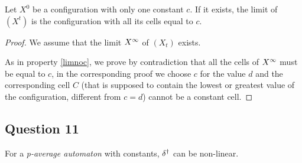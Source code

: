 
\begin{prop}
  \label{twocst}
  Let $X^0$ be a configuration with only one constant $c$. If it exists, the limit of $(X^t)$ is the configuration with all its cells equal to $c$.
\end{prop}

\begin{proof}
  We assume that the limit $X^{\infty}$ of $(X_t)$ exists.
  
  As in property \ref{limnoc}, we prove by contradiction that all the cells of $X^{\infty}$ must be equal to $c$, in the corresponding proof we choose $c$ for the value $d$ and the corresponding cell $C$ (that is supposed to contain the lowest or greatest value of the configuration, different from $c=d$) cannot be a constant cell.
\end{proof}


\subsection*{Question 11}

 \begin{prop}
    For a \textit{p-average automaton} with constants, $\delta^{\dag}$ can be non-linear.
 \end{prop}

